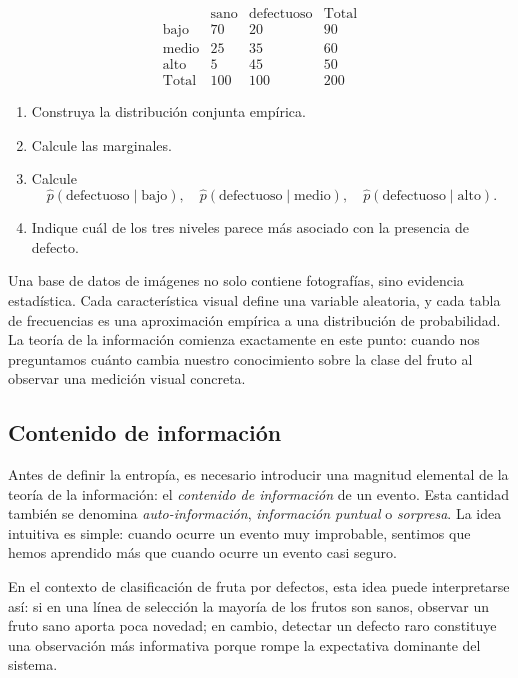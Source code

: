 \documentclass{article}
\begin{document}
\[
\begin{array}{c|cc|c}
 & \text{sano} & \text{defectuoso} & \text{Total} \\
\hline
\text{bajo} & 70 & 20 & 90 \\
\text{medio} & 25 & 35 & 60 \\
\text{alto} & 5 & 45 & 50 \\
\hline
\text{Total} & 100 & 100 & 200
\end{array}
\]

\begin{enumerate}
\item Construya la distribución conjunta empírica.
\item Calcule las marginales.
\item Calcule
\[
\widehat{p}(\text{defectuoso}\mid \text{bajo}),\quad
\widehat{p}(\text{defectuoso}\mid \text{medio}),\quad
\widehat{p}(\text{defectuoso}\mid \text{alto}).
\]
\item Indique cuál de los tres niveles parece más asociado con la presencia de defecto.
\end{enumerate}

Una base de datos de imágenes no solo contiene fotografías, sino evidencia estadística. Cada característica visual define una variable aleatoria, y cada tabla de frecuencias es una aproximación empírica a una distribución de probabilidad. La teoría de la información comienza exactamente en este punto: cuando nos preguntamos cuánto cambia nuestro conocimiento sobre la clase del fruto al observar una medición visual concreta.

\subsection{Contenido de información}

Antes de definir la entropía, es necesario introducir una magnitud elemental de la teoría de la información: el \textit{contenido de información} de un evento. Esta cantidad también se denomina \textit{auto-información}, \textit{información puntual} o \textit{sorpresa}. La idea intuitiva es simple: cuando ocurre un evento muy improbable, sentimos que hemos aprendido más que cuando ocurre un evento casi seguro.

En el contexto de clasificación de fruta por defectos, esta idea puede interpretarse así: si en una línea de selección la mayoría de los frutos son sanos, observar un fruto sano aporta poca novedad; en cambio, detectar un defecto raro constituye una observación más informativa porque rompe la expectativa dominante del sistema.
\end{document}
